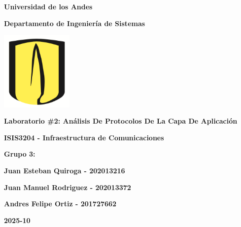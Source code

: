 \documentclass[10pt]{article}
\title{ }
\begin{document}
\begingroup
\let\clearpage\relax %
\thispagestyle{empty}
\begin{center}
{\huge \bfseries Universidad de los Andes}

\vspace{25pt}
{\LARGE \bfseries Departamento de Ingeniería de Sistemas}

\vspace{15pt}
\includegraphics[width=100pt]{images/logo.png} 

\vspace{35pt}
{\LARGE \bfseries Laboratorio \#2: Análisis De Protocolos De La Capa De Aplicación}
\vspace{55pt}

{\Large \bfseries ISIS3204 - Infraestructura de Comunicaciones}


\vspace{100pt}
{\Large \bfseries Grupo 3: }

\end{center}

\begin{flushleft}
  \setlength{\parskip}{0pt}
  \setlength{\itemsep}{0pt}
  \hspace*{4cm}\large\bfseries Juan Esteban Quiroga - 202013216

  \hspace*{4cm}\large\bfseries Juan Manuel Rodriguez - 202013372

  \hspace*{4cm}\large\bfseries Andres Felipe Ortiz - 201727662
\end{flushleft}

\begin{center}
\vspace{60pt}

\Large\bfseries 2025-10
\end{center}

\mbox{}
\endgroup

\clearpage

\tableofcontents
\clearpage


\renewcommand{\thesection}{\arabic{section}}
\end{document}

